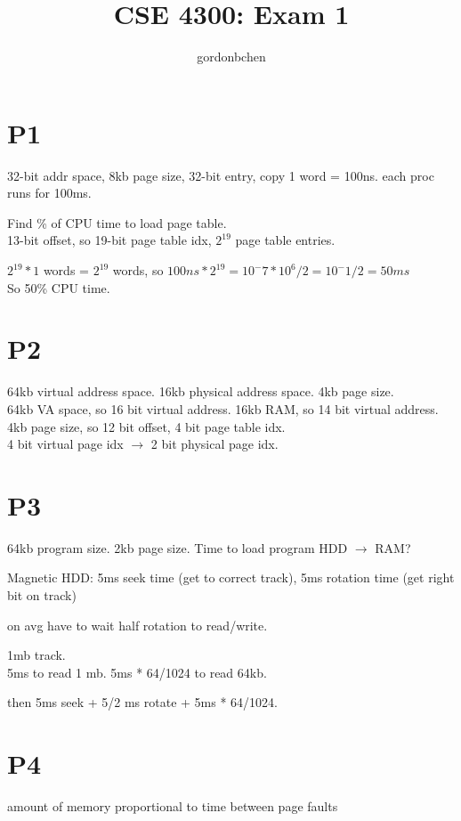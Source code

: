 \documentclass[11pt]{article}
\title{CSE 4300: Exam 1}
\author{gordonbchen}
\date{}
\begin{document}
\maketitle


\section{P1}
32-bit addr space, 8kb page size, 32-bit entry, copy 1 word = 100ns. each proc runs for 100ms.

Find \% of CPU time to load page table.\\

13-bit offset, so 19-bit page table idx, $2^{19}$ page table entries.

$2^{19} * 1$ words = $2^{19}$ words, so $100ns * 2^{19} = 10^-7 * 10^6 / 2 = 10^-1 / 2 = 50 ms$\\

So 50\% CPU time.


\section{P2}
64kb virtual address space. 16kb physical address space. 4kb page size.\\

64kb VA space, so 16 bit virtual address. 16kb RAM, so 14 bit virtual address.\\

4kb page size, so 12 bit offset, 4 bit page table idx.\\

4 bit virtual page idx $\to$ 2 bit physical page idx.


\section{P3}
64kb program size. 2kb page size. Time to load program HDD $\to$ RAM?

Magnetic HDD: 5ms seek time (get to correct track), 5ms rotation time (get right bit on track)

on avg have to wait half rotation to read/write.

1mb track.\\

5ms to read 1 mb. 5ms * 64/1024 to read 64kb.

then 5ms seek + 5/2 ms rotate + 5ms * 64/1024.


\section{P4}
amount of memory proportional to time between page faults
\end{document}
